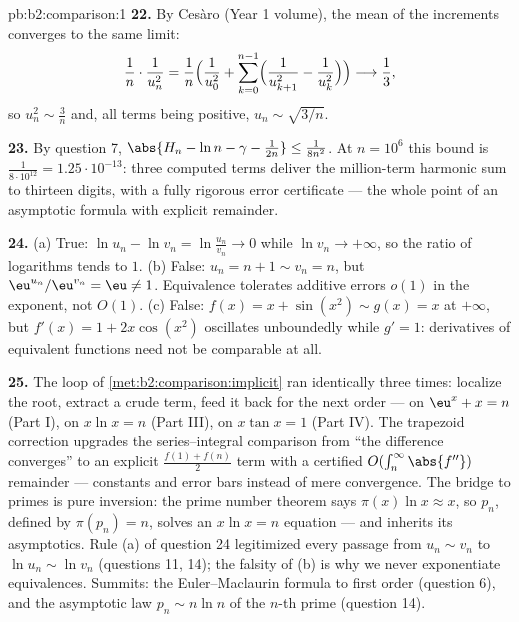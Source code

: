 \begin{solution}{pb:b2:comparison:1}
\textbf{22.} By Ces\`aro (Year 1 volume), the mean of the
increments converges to the same limit:
\[
\frac{1}{n}\cdot\frac{1}{u_n^2}
= \frac1n\Bigl(\frac1{u_0^2} + \sum_{k=0}^{n-1}
\Bigl(\frac1{u_{k+1}^2} - \frac1{u_k^2}\Bigr)\Bigr)
\longrightarrow \frac13 ,
\]
so $u_n^2 \sim \frac3n$ and, all terms being positive, $u_n
\sim \sqrt{3/n}$.

\textbf{23.} By question 7, $\abs{H_n - \ln n - \gamma -
\frac1{2n}} \leq \frac1{8n^2}$. At $n = 10^6$ this bound is
$\frac{1}{8\cdot10^{12}} = 1.25\cdot10^{-13}$: three computed
terms deliver the million-term harmonic sum to thirteen
digits, with a fully rigorous error certificate --- the whole
point of an asymptotic formula with explicit remainder.

\textbf{24.} (a) True: $\ln u_n - \ln v_n = \ln\frac{u_n}{v_n}
\to 0$ while $\ln v_n \to +\infty$, so the ratio of logarithms
tends to $1$. (b) False: $u_n = n + 1 \sim v_n = n$, but
$\eu^{u_n}/\eu^{v_n} = \eu \neq 1$. Equivalence tolerates
additive errors $o(1)$ in the exponent, not $O(1)$. (c) False:
$f(x) = x + \sin(x^2) \sim g(x) = x$ at $+\infty$, but $f'(x)
= 1 + 2x\cos(x^2)$ oscillates unboundedly while $g' = 1$:
derivatives of equivalent functions need not be comparable at
all.

\textbf{25.} The loop of \cref{met:b2:comparison:implicit} ran
identically three times: localize the root, extract a crude
term, feed it back for the next order --- on $\eu^x + x = n$
(Part I), on $x\ln x = n$ (Part III), on $x\tan x = 1$ (Part
IV). The trapezoid correction upgrades the series--integral
comparison from ``the difference converges'' to an explicit
$\frac{f(1) + f(n)}2$ term with a certified $O(\int_n^\infty
\abs{f''})$ remainder --- constants and error bars instead of
mere convergence. The bridge to primes is pure inversion: the
prime number theorem says $\pi(x)\ln x \approx x$, so $p_n$,
defined by $\pi(p_n) = n$, solves an $x\ln x = n$ equation ---
and inherits its asymptotics. Rule (a) of question 24
legitimized every passage from $u_n \sim v_n$ to $\ln u_n \sim
\ln v_n$ (questions 11, 14); the falsity of (b) is why we
never exponentiate equivalences. Summits: the Euler--Maclaurin
formula to first order (question 6), and the asymptotic law
$p_n \sim n\ln n$ of the $n$-th prime (question 14).
\end{solution}
